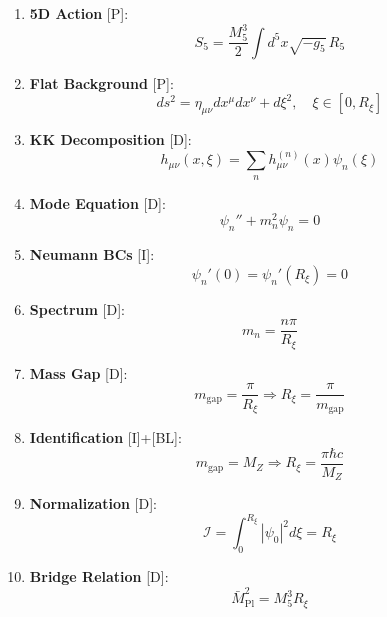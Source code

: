 \documentclass[11pt,a4paper]{article}
\newcommand{\Rxi}{R_\xi}
\newcommand{\Mplbar}{\bar{M}_{\mathrm{Pl}}}
\newcommand{\Mfive}{M_5}
\newcommand{\calI}{\mathcal{I}}
\newcommand{\MZ}{M_Z}
\newcommand{\mgap}{m_{\mathrm{gap}}}
\begin{document}
\begin{enumerate}
\item \textbf{5D Action} [P]:
\begin{equation}
S_5 = \frac{\Mfive^3}{2} \int d^5x \sqrt{-g_5}\, R_5
\end{equation}

\item \textbf{Flat Background} [P]:
\begin{equation}
ds^2 = \eta_{\mu\nu}dx^\mu dx^\nu + d\xi^2, \quad \xi \in [0, \Rxi]
\end{equation}

\item \textbf{KK Decomposition} [D]:
\begin{equation}
h_{\mu\nu}(x,\xi) = \sum_n h_{\mu\nu}^{(n)}(x) \psi_n(\xi)
\end{equation}

\item \textbf{Mode Equation} [D]:
\begin{equation}
\psi_n'' + m_n^2 \psi_n = 0
\end{equation}

\item \textbf{Neumann BCs} [I]:
\begin{equation}
\psi_n'(0) = \psi_n'(\Rxi) = 0
\end{equation}

\item \textbf{Spectrum} [D]:
\begin{equation}
m_n = \frac{n\pi}{\Rxi}
\end{equation}

\item \textbf{Mass Gap} [D]:
\begin{equation}
\mgap = \frac{\pi}{\Rxi} \Rightarrow \Rxi = \frac{\pi}{\mgap}
\end{equation}

\item \textbf{Identification} [I]+[BL]:
\begin{equation}
\mgap = \MZ \Rightarrow \Rxi = \frac{\pi\hbar c}{\MZ}
\end{equation}

\item \textbf{Normalization} [D]:
\begin{equation}
\calI = \int_0^{\Rxi} |\psi_0|^2 d\xi = \Rxi
\end{equation}

\item \textbf{Bridge Relation} [D]:
\begin{equation}
\Mplbar^2 = \Mfive^3 \Rxi
\end{equation}


\end{enumerate}
\end{document}
